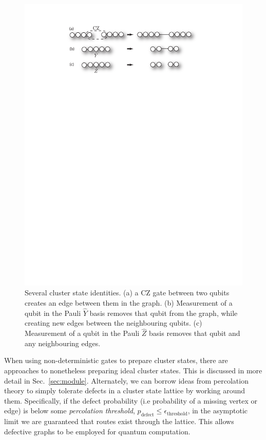 \documentclass[aps,rmp,twocolumn,amsmath,amssymb,nofootinbib,superscriptaddress,longbibliography,floatfix,table-of-contents,eqsecnum]{revtex4-1}
\begin{document}
\begin{figure}[!htb]
	\includegraphics[width=\columnwidth]{cluster_identities} 
	\caption{Several cluster state identities. (a) a CZ gate between two qubits creates an edge between them in the graph. (b) Measurement of a qubit in the Pauli $\hat{Y}$ basis removes that qubit from the graph, while creating new edges between the neighbouring qubits. (c) Measurement of a qubit in the Pauli $\hat{Z}$ basis removes that qubit and any neighbouring edges.} \label{fig:cluster_ident} 
\end{figure}

When using non-deterministic gates to prepare cluster states, there are approaches to nonetheless preparing ideal cluster states. This is discussed in more detail in Sec.~\ref{sec:module}. Alternately, we can borrow ideas from percolation theory to simply tolerate defects in a cluster state lattice by working around them. Specifically, if the defect probability (i.e probability of a missing vertex or edge) is below some \textit{percolation threshold}, \mbox{$p_\text{defect}\leq \epsilon_\text{threshold}$}, in the asymptotic limit we are guaranteed that routes exist through the lattice. This allows defective graphs to be employed for quantum computation.
\end{document}
